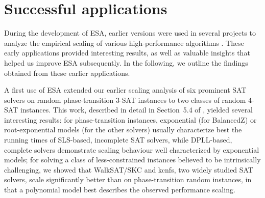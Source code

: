 \documentclass[aic]{iosart2x}
\begin{document}
\section{Successful applications}
\label{sec:Successful Applications}

During the development of ESA, earlier versions were used in several projects to analyze the empirical scaling of various high-performance algorithms \cite{Mu15}. These early applications provided interesting results, as well as valuable insights that helped us improve ESA subsequently. 
In the following, we outline the findings obtained from these earlier applications.

A first use of ESA extended our earlier scaling analysis of six prominent SAT solvers on random phase-transition 3-SAT instances \cite{MuHoo15} to two classes of random 4-SAT instances. This work, described in detail in Section~5.4 of \cite{Mu15}, yielded several interesting results: for phase-transition instances, exponential (for BalancedZ) or root-exponential models (for the other solvers) usually characterize best the running times of SLS-based, incomplete SAT solvers, while DPLL-based, complete solvers demonstrate scaling behaviour well characterized by exponential models; for solving a class of less-constrained instances believed to be intrinsically challenging, we showed that WalkSAT/SKC and kcnfs, two widely studied SAT solvers, scale significantly better than on phase-transition random instances, in that a polynomial model best describes the observed performance scaling.
\end{document}
